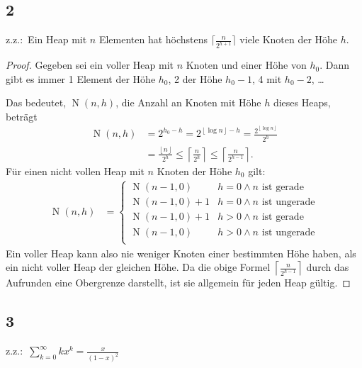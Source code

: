 \documentclass[a4paper]{article}
\newcommand{\N}{\operatorname{N}}
\newcommand{\ceil}[1]{\left\lceil{}{#1}\right\rceil}
\newcommand{\floor}[1]{\left\lfloor{}{#1}\right\rfloor}
\begin{document}
    \subsection*{2}
    \label{subsec:aufgabe2_2}
    z.z.:\  Ein Heap mit $n$ Elementen hat höchstens $\lceil\frac{n}{2^{h+1}}\rceil$ viele Knoten der Höhe $h$.

    \begin{proof}
        Gegeben sei ein voller Heap mit $n$ Knoten und einer Höhe von $h_0$.
        Dann gibt es immer 1 Element der Höhe $h_0$, 2 der Höhe $h_0 - 1$, 4 mit $h_0 - 2$, \dots

        Das bedeutet, $\operatorname{N}(n, h)$, die Anzahl an Knoten mit Höhe $h$ dieses Heaps, beträgt
        \begin{align*}
            \N(n, h) &= 2^{h_0 - h} = 2^{\floor{\log{n}} - h} = \frac{2^{\floor{\log{n}}}}{2^h} \\
            &= \frac{\floor{n}}{2^h} \leq \ceil{\frac{n}{2^h}} \leq \ceil{\frac{n}{2^{h-1}}}
            \text{.}
        \end{align*}
        Für einen nicht vollen Heap mit $n$ Knoten der Höhe $h_0$ gilt:
        \begin{align*}
            \N(n, h) &=
            \begin{cases}
                \N(n - 1, 0)        & h = 0 \wedge n \text{ ist gerade} \\
                \N(n - 1, 0) + 1    & h = 0 \wedge n \text{ ist ungerade} \\
                \N(n - 1, 0) + 1    & h > 0 \wedge n \text{ ist gerade} \\
                \N(n - 1, 0)        & h > 0 \wedge n \text{ ist ungerade} \\
            \end{cases}
        \end{align*}
        Ein voller Heap kann also nie weniger Knoten einer bestimmten Höhe haben, als ein nicht voller Heap der gleichen Höhe.
        Da die obige Formel $\ceil{\frac{n}{2^{h-1}}}$ durch das Aufrunden eine Obergrenze darstellt, ist sie allgemein für jeden Heap gültig.
    \end{proof}

    \subsection*{3}
    \label{subsec:aufgabe2_3}
    z.z.:~$\sum_{k=0}^{\infty}{k x^k} = \frac{x}{(1 - x)^2}$
\end{document}

